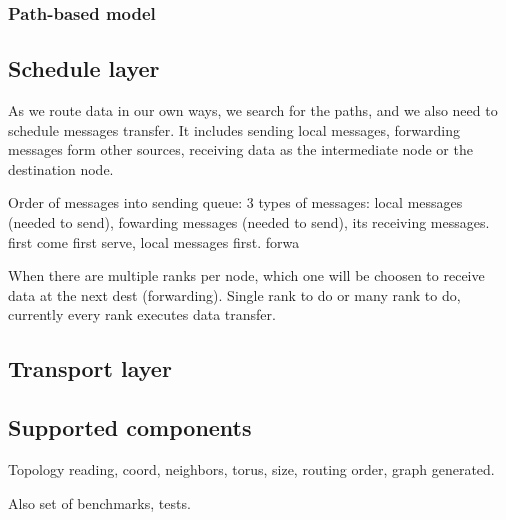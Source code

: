 \subsubsection{Path-based model}

\subsection{Schedule layer}

As we route data in our own ways, we search for the paths, and we also need to schedule messages transfer. It includes sending local messages, forwarding messages form other sources, receiving data as the intermediate node or the destination node.

Order of messages into sending queue: 3 types of messages: local messages (needed to send), fowarding messages (needed to send), its receiving messages. first come first serve, local messages first. forwa

When there are multiple ranks per node, which one will be choosen to receive data at the next dest (forwarding). Single rank to do or many rank to do, currently every rank executes data transfer.

\subsection{Transport layer}

\subsection{Supported components}

Topology reading, coord, neighbors, torus, size, routing order, graph generated.

Also set of benchmarks, tests.
